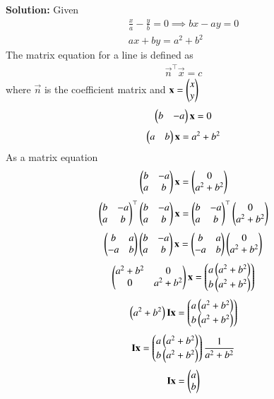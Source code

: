 \documentclass[journal]{IEEEtran}
\begin{document}
\textbf{Solution:}  
Given  
\begin{align}
\frac{x}{a}-\frac{y}{b}=0 \implies bx-ay=0 \\
ax+by=a^{2}+b^{2} 
\end{align}
The matrix equation for a line is defined as
\begin{align}
    \vec{n}^\top\vec{x}=c
\end{align}
where $\vec{n}$ is the coefficient matrix and $\mathbf{x}=\begin{pmatrix}x\\y\end{pmatrix}$
\begin{align}
    \begin{pmatrix}b&-a\end{pmatrix}\mathbf{x}=0
    \end{align}
    \begin{align}
    \begin{pmatrix}a&b\end{pmatrix}\mathbf{x}=a^{2}+b^{2} 
\end{align}
As a matrix equation
\begin{align}
 \begin{pmatrix}b&-a\\a&b\end{pmatrix}\mathbf{x}=\begin{pmatrix}0\\a^{2}+b^{2}\end{pmatrix} 
  \end{align}
  \begin{align}
    \begin{pmatrix}b&-a\\a&b\end{pmatrix}^\top\begin{pmatrix}b&-a\\a&b\end{pmatrix}\mathbf{x}= \begin{pmatrix}b&-a\\a&b\end{pmatrix}^\top\begin{pmatrix}0\\a^{2}+b^{2}\end{pmatrix} 
    \end{align}
    \begin{align}
    \begin{pmatrix}b&a\\-a&b\end{pmatrix}\begin{pmatrix}b&-a\\a&b\end{pmatrix}\mathbf{x}= \begin{pmatrix}b&a\\-a&b\end{pmatrix}\begin{pmatrix}0\\a^{2}+b^{2}\end{pmatrix}  
  \end{align}
  \begin{align}
\begin{pmatrix}a^{2}+b^{2}&0\\0&a^{2}+b^{2}\end{pmatrix}\mathbf{x}=\begin{pmatrix}a\left(a^{2}+b^{2}\right)\\b\left(a^{2}+b^{2}\right)\end{pmatrix}
  \end{align}
  \begin{align}
\left(a^{2}+b^{2}\right)\mathbf{I}\mathbf{x}=\begin{pmatrix}a\left(a^{2}+b^{2}\right)\\b\left(a^{2}+b^{2}\right)\end{pmatrix} 
\end{align}
\begin{align}
\mathbf{I}\mathbf{x}=\begin{pmatrix}a\left(a^{2}+b^{2}\right)\\b\left(a^{2}+b^{2}\right)\end{pmatrix} \frac{1}{a^{2}+b^{2}} 
  \end{align}
  \begin{align}
      \mathbf{I}\mathbf{x}=\begin{pmatrix}a\\b\end{pmatrix}
  \end{align}
\end{document}
